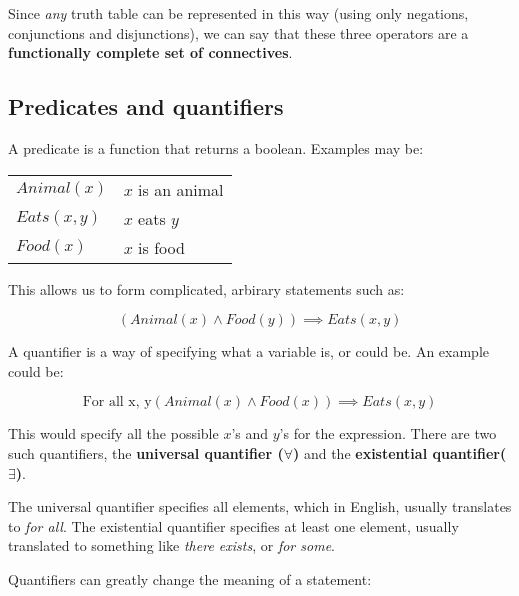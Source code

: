 Since {\it any} truth table can be represented in this way (using only
negations, conjunctions and disjunctions), we can say that these three operators
are a {\bf functionally complete set of connectives}.


\subsection{Predicates and quantifiers}

A predicate is a function that returns a boolean. Examples may be:

\begin{center}
	\begin{tabular}{l l}
		$Animal(x)$ & $x$ is an animal\\
		$Eats(x, y)$ & $x$ eats $y$\\
		$Food(x)$ & $x$ is food\\
	\end{tabular}
\end{center}

This allows us to form complicated, arbirary statements such as:

\begin{dmath}
	{\left(Animal(x) \wedge Food(y)\right) \implies Eats(x, y)}
\end{dmath}

A quantifier is a way of specifying what a variable is, or could be. An example
could be:

\begin{dmath}
	{\textrm{For all x, y} \left(Animal(x) \wedge Food(x)\right) \implies Eats(x, y)}
\end{dmath}

This would specify all the possible $x$'s and $y$'s for the expression. There
are two such quantifiers, the {\bf universal quantifier ($\forall$)} and the
{\bf existential quantifier($\exists$)}.

The universal quantifier specifies all elements, which in English, usually
translates to {\it for all}. The existential quantifier specifies at least one
element, usually translated to something like {\it there exists}, or {\it for
some}.

Quantifiers can greatly change the meaning of a statement:

